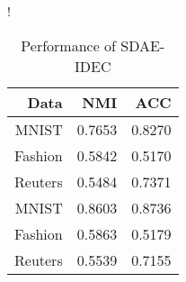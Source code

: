 \begin{table}[ht]
\caption{Performance of SDAE-IDEC}\label{tab:idec-models}
\resizebox{\columnwidth}!{
\begin{tabular}{ | r | r | r |}
\hline
Data & NMI & ACC  \\ \hline 
MNIST & 0.7653 & 0.8270 \\ \hline 
Fashion & 0.5842 & 0.5170 \\ \hline 
Reuters & 0.5484 & 0.7371 \\ \hline 
MNIST & 0.8603 & 0.8736 \\ \hline 
Fashion & 0.5863 & 0.5179 \\ \hline 
Reuters & 0.5539 & 0.7155 \\ 
\hline
\end{tabular}
}
\end{table}